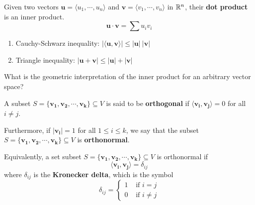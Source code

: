 \begin{example}
    Given two vectors $\bm{u} = \langle u_1, \cdots, u_n \rangle$ and $\bm{v}  = \langle v_1 , \cdots, v_n \rangle$ in $\mathbb{R}^n$, their \textbf{dot product} is an inner product. $$\bm{u} \cdot \bm{v} = \sum u_iv_i$$
    \end{example}

\begin{theorem}
    
    \begin{enumerate}
        \item Cauchy-Schwarz inequality: $| \langle \bm{u},\bm{v} \rangle | \leq  | \bm{u}| \ | \bm{v} |$
        \item Triangle inequality: $| \bm{u}+ \bm{v} | \leq  | \bm{u}| +| \bm{v} |$
    \end{enumerate}
    
    \end{theorem}





\begin{motivating}
What is the geometric interpretation of the inner product for an arbitrary vector space?
\end{motivating}

\begin{definition}
    A subset $S = \{\bm{v_1}, \bm{v_2}, \cdots, \bm{v_k}\} \subseteq V$ is said to be \textbf{orthogonal} if $\langle \bm{v_i}, \bm{v_j} \rangle = 0$ for all $i \neq j$.
    
    \vspace{1em}
    
    Furthermore, if $|\bm{v_i}| = 1$ for all $1 \leq i \leq k$, we say that the subset $S = \{\bm{v_1}, \bm{v_2}, \cdots, \bm{v_k}\} \subseteq V$ is \textbf{orthonormal}.
\end{definition}
    
    \begin{proposition}
        Equivalently, a set subset $S = \{\bm{v_1}, \bm{v_2}, \cdots, \bm{v_k}\} \subseteq V$ is orthonormal if $$\langle \bm{v_i}, \bm{v_j} \rangle = \delta_{ij}$$ 
        where $\delta_{ij}$ is the \textbf{Kronecker delta}, which is the symbol $$\delta_{ij} = \left\{
		\begin{array}{ll}
			1 & \text{ if } i = j \\
			0 & \text{ if } i \neq j
		\end{array}
		\right.$$
    \end{proposition}


